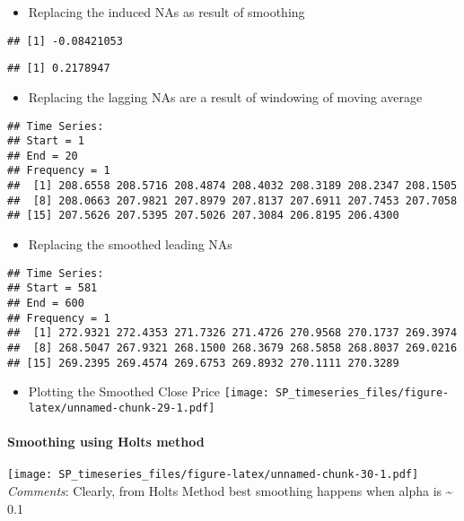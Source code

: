 \documentclass[]{article}
\providecommand{\tightlist}{%
  \setlength{\itemsep}{0pt}\setlength{\parskip}{0pt}}
\let\oldparagraph\paragraph
\renewcommand{\paragraph}[1]{\oldparagraph{#1}\mbox{}}
\begin{document}
\begin{itemize}
\tightlist
\item
  Replacing the induced NAs as result of smoothing
\end{itemize}

\begin{verbatim}
## [1] -0.08421053
\end{verbatim}

\begin{verbatim}
## [1] 0.2178947
\end{verbatim}

\begin{itemize}
\tightlist
\item
  Replacing the lagging NAs are a result of windowing of moving average
\end{itemize}

\begin{verbatim}
## Time Series:
## Start = 1 
## End = 20 
## Frequency = 1 
##  [1] 208.6558 208.5716 208.4874 208.4032 208.3189 208.2347 208.1505
##  [8] 208.0663 207.9821 207.8979 207.8137 207.6911 207.7453 207.7058
## [15] 207.5626 207.5395 207.5026 207.3084 206.8195 206.4300
\end{verbatim}

\begin{itemize}
\tightlist
\item
  Replacing the smoothed leading NAs
\end{itemize}

\begin{verbatim}
## Time Series:
## Start = 581 
## End = 600 
## Frequency = 1 
##  [1] 272.9321 272.4353 271.7326 271.4726 270.9568 270.1737 269.3974
##  [8] 268.5047 267.9321 268.1500 268.3679 268.5858 268.8037 269.0216
## [15] 269.2395 269.4574 269.6753 269.8932 270.1111 270.3289
\end{verbatim}

\begin{itemize}
\tightlist
\item
  Plotting the Smoothed Close Price
  \texttt{[image: SP\_timeseries\_files/figure-latex/unnamed-chunk-29-1.pdf]}
\end{itemize}

\paragraph{Smoothing using Holts
method}\label{smoothing-using-holts-method}

\texttt{[image: SP\_timeseries\_files/figure-latex/unnamed-chunk-30-1.pdf]}
\emph{Comments}: Clearly, from Holts Method best smoothing happens when
alpha is \textasciitilde{} 0.1
\end{document}

